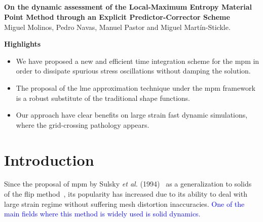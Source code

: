 \documentclass[preprint,12pt,a4paper]{elsarticle}
\begin{document}
\begin{frontmatter}
\section*{}
\centering
\Large
\textbf{On the dynamic assessment of the Local-Maximum Entropy Material Point Method through an Explicit Predictor-Corrector Scheme}\\
\setlength{\parskip}{1cm plus 5mm minus 4mm}
Miguel Molinos, Pedro Navas, Manuel Pastor and Miguel Mart\'in-Stickle.

\setlength{\parskip}{1cm plus 5mm minus 4mm}
\setlength{\parskip}{1cm plus 5mm minus 4mm}
\large
\textbf{Highlights}
\normalsize
\begin{itemize}
\item We have proposed a new and efficient time integration scheme for the \acrshort{mpm} in order to dissipate spurious stress oscillations without damping the solution.
\item The proposal of the \acrshort{lme} approximation technique
  under the \acrshort{mpm} framework is a robust substitute of the
  traditional shape functions.
\item Our approach have clear benefits on large strain fast dynamic simulations, where the grid-crossing pathology appears. 
\end{itemize}


\end{frontmatter}


\linenumbers

\section{Introduction}
\label{intro}
Since the proposal of \acrshort{mpm} by Sulsky {\it  et al.}
(1994)~\cite{Sulsky1994} as a generalization to solids of the \acrfull{flip} method~\cite{Brackbill1986}, its popularity
has increased due to its ability to deal with large strain regime
without suffering mesh distortion inaccuracies. \textcolor{blue}{One of the main fields where this method is widely used is solid dynamics.}
\end{document}
